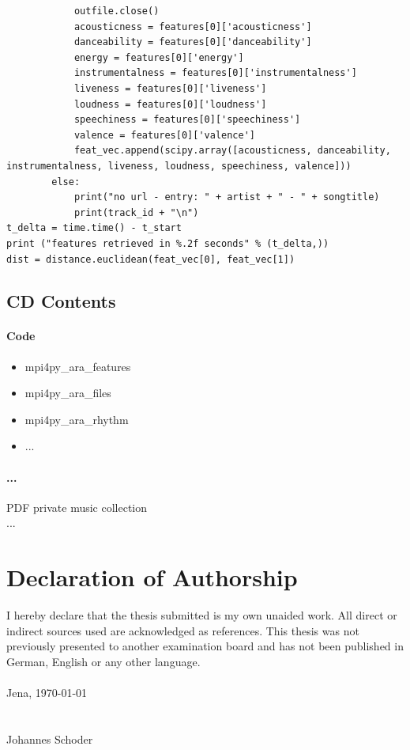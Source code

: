 \documentclass[a4paper,oneside,12pt]{report}
\begin{document}
\begin{lstlisting}
			outfile.close()    
			acousticness = features[0]['acousticness']
			danceability = features[0]['danceability']
			energy = features[0]['energy']
			instrumentalness = features[0]['instrumentalness']
			liveness = features[0]['liveness']
			loudness = features[0]['loudness']
			speechiness = features[0]['speechiness']
			valence = features[0]['valence']
			feat_vec.append(scipy.array([acousticness, danceability, instrumentalness, liveness, loudness, speechiness, valence]))	
		else: 
			print("no url - entry: " + artist + " - " + songtitle)
			print(track_id + "\n")
t_delta = time.time() - t_start
print ("features retrieved in %.2f seconds" % (t_delta,))   
dist = distance.euclidean(feat_vec[0], feat_vec[1])
\end{lstlisting}



\section{CD Contents}\label{DVD}

\subsubsection{Code}

\begin{itemize}
	\setlength\itemsep{-0.5em}
	\item mpi4py\_ara\_features 
	\item mpi4py\_ara\_files 
	\item mpi4py\_ara\_rhythm
	\item ... 
\end{itemize}

\subsubsection{...}

PDF private music collection\\
...



\chapter*{Declaration of Authorship}

I hereby declare that the thesis submitted is my own unaided work. All direct or indirect
sources used are acknowledged as references.
This thesis was not previously presented to another examination board and has not been
published in German, English or any other language.\\
\ \\
Jena, \today
\ \\
\ \\
\ \\
Johannes Schoder
\end{document}
